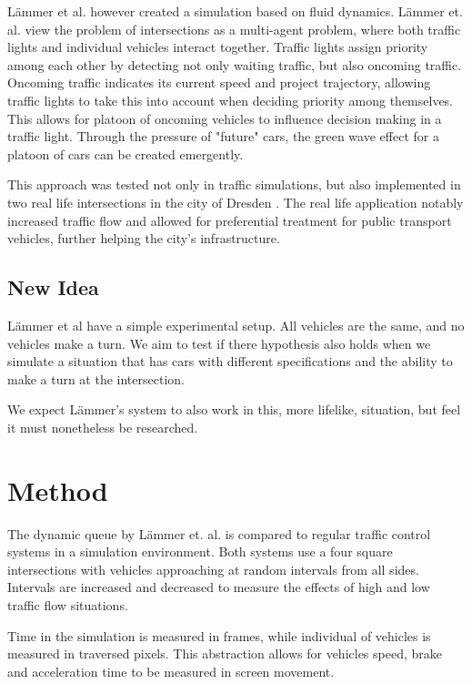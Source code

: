 \documentclass{article}
\begin{document}
L{\"a}mmer et al. \cite{self_control2008} however created a simulation based on fluid dynamics.  L{\"a}mmer et. al. view the problem of intersections as a multi-agent problem, where both traffic lights and individual vehicles interact together. Traffic lights assign priority among each other by detecting not only waiting traffic, but also oncoming traffic. Oncoming traffic indicates its current speed and project trajectory, allowing traffic lights to take this into account when deciding priority among themselves. This allows for platoon of oncoming vehicles to influence decision making in a traffic light. Through the pressure of "future"  cars, the green wave effect for a platoon of cars can be created emergently.

This approach was tested not only in traffic simulations, but also implemented in two real life intersections in the city of Dresden \cite{site}. The real life application notably increased traffic flow and allowed for preferential treatment for public transport vehicles, further helping the city's infrastructure.


\subsection{New Idea}
L{\"a}mmer et al have a simple experimental setup. All vehicles are the same, and no vehicles make a turn. We aim to test if there hypothesis also holds when we simulate a situation that has cars with different specifications and the ability to make a turn at the intersection.

We expect L{\"a}mmer's system to also work in this, more lifelike, situation, but feel it must nonetheless be researched.



\section{Method}
The dynamic queue by L{\"a}mmer et. al. is compared to regular traffic control systems in a simulation environment. Both systems use a four square intersections with vehicles approaching at random intervals from all sides. Intervals are increased and decreased to measure the effects of high and low traffic flow situations. 

Time in the simulation is measured in frames, while individual of vehicles is measured in traversed pixels. This abstraction allows for vehicles speed, brake and acceleration time to be measured in screen movement.
\end{document}
